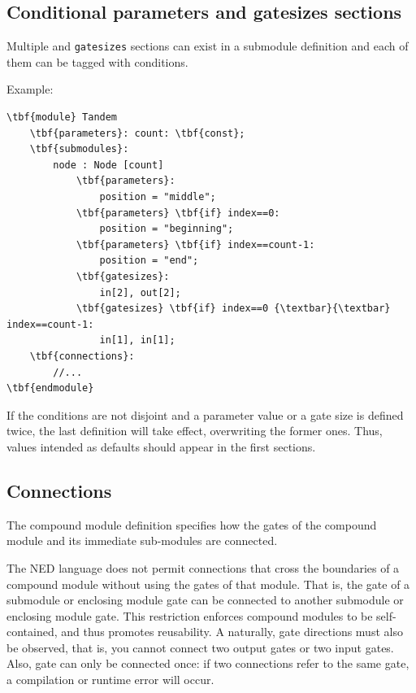 \subsection{Conditional parameters and gatesizes sections}


Multiple  and
\texttt{gatesizes} sections can exist in a submodule
definition and each of them can be tagged with
conditions.

Example:

\begin{Verbatim}[commandchars=\\\{\}]
\tbf{module} Tandem
    \tbf{parameters}: count: \tbf{const};
    \tbf{submodules}:
        node : Node [count]
            \tbf{parameters}:
                position = "middle";
            \tbf{parameters} \tbf{if} index==0:
                position = "beginning";
            \tbf{parameters} \tbf{if} index==count-1:
                position = "end";
            \tbf{gatesizes}:
                in[2], out[2];
            \tbf{gatesizes} \tbf{if} index==0 {\textbar}{\textbar} index==count-1:
                in[1], in[1];
    \tbf{connections}:
        //...
\tbf{endmodule}
\end{Verbatim}


If the conditions are not disjoint and a parameter value or a
gate size is defined twice, the last definition will take effect,
overwriting the former ones. Thus, values intended as defaults
should appear in the first sections.



\subsection{Connections}


The compound module definition specifies how the gates of the compound
module and its immediate sub-modules are connected.

The NED language does not permit connections that cross the boundaries
of a compound module without using the gates of that module.
That is, the gate of a submodule or enclosing module gate can be connected
to another submodule or enclosing module gate. This restriction
enforces compound modules to be self-contained, and thus promotes
reusability. A naturally, gate directions must also be observed,
that is, you cannot connect two output gates or two input gates.
Also, gate can only be connected once: if two connections refer to
the same gate, a compilation or runtime error will occur.

